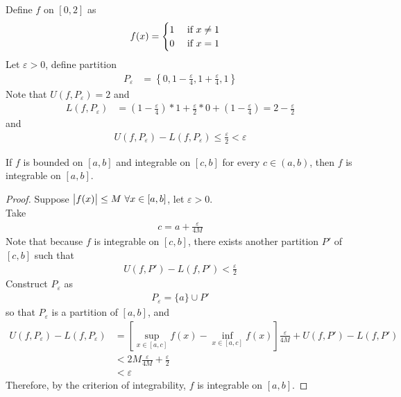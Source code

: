 \documentclass[11pt]{article}
\begin{document}
	\begin{example}
		Define $f$ on $[0, 2]$ as
		\begin{align}
			f(x) &= \begin{cases}
				1 &\text{{ if }} x \neq 1 \\
				0 &\text{{ if }} x = 1
			\end{cases}
		\end{align}
		Let $\varepsilon > 0$, define partition
		\begin{align}
			P_\varepsilon &= \left \{0, 1 - \frac{\varepsilon}{4}, 1 + \frac{\varepsilon}{4}, 1 \right \}
		\end{align}
		Note that $U(f, P_\varepsilon) = 2$ and 
		\begin{align}
			L(f, P_\varepsilon) &= \left(1 - \frac{\varepsilon}{4} \right) * 1 + \frac{\varepsilon}{2} * 0 + \left(1 - \frac{\varepsilon}{4} \right) = 2 - \frac{\varepsilon}{2}
		\end{align}
		and 
		\begin{align}
			U(f, P_\varepsilon) - L(f, P_\varepsilon) \leq \frac{\varepsilon}{2} < \varepsilon
		\end{align}
	\end{example}
	
	\begin{theorem}
		If $f$ is bounded on $[a, b]$ and integrable on $[c, b]$ for every $c \in (a, b)$, then $f$ is integrable on $[a, b]$.
	\end{theorem}
	
	\begin{proof}
		Suppose $\abs{f(x)} \leq M\ \forall x \in [a, b]$, let $\varepsilon > 0$. \\
		Take
		\begin{align}
			c = a + \frac{\varepsilon}{4M}
		\end{align}
		Note that because $f$ is integrable on $[c, b]$, there exists another partition $P'$ of $[c, b]$ such that
		\begin{align}
			U(f, P') - L(f, P') < \frac{\varepsilon}{2} 
		\end{align}
		Construct $P_\varepsilon$ as
		\begin{align}
			P_\varepsilon = \{a\} \cup P'
		\end{align}
		so that $P_\varepsilon$ is a partition of $[a, b]$, and
		\begin{align}
			U(f, P_\varepsilon) - L(f, P_\varepsilon) &= \left[\sup_{x \in [a, c]} f(x) - \inf_{x \in [a, c]} f(x) \right] \frac{\varepsilon}{4M} + U(f, P') - L(f, P') \\
			&< 2M \frac{\varepsilon}{4M} + \frac{\varepsilon}{2} \\
			&< \varepsilon
		\end{align}
		Therefore, by the criterion of integrability, $f$ is integrable on $[a, b]$.
	\end{proof}
	
\end{document}
